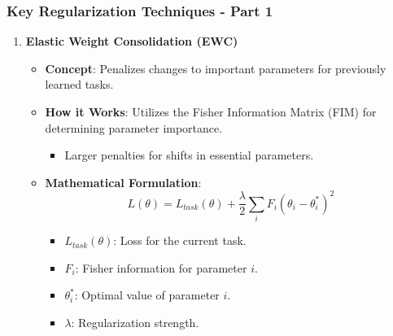 \documentclass[aspectratio=169]{beamer}
\begin{document}
\begin{frame}[fragile]
    \frametitle{Key Regularization Techniques - Part 1}
    \begin{enumerate}
        \item \textbf{Elastic Weight Consolidation (EWC)}
        \begin{itemize}
            \item \textbf{Concept}: Penalizes changes to important parameters for previously learned tasks.
            \item \textbf{How it Works}: Utilizes the Fisher Information Matrix (FIM) for determining parameter importance.
            \begin{itemize}
                \item Larger penalties for shifts in essential parameters.
            \end{itemize}
            \item \textbf{Mathematical Formulation}:
            \begin{equation}
            L(\theta) = L_{task}(\theta) + \frac{\lambda}{2} \sum_{i} F_{i} (\theta_i - \theta^*_i)^2
            \end{equation}
            \begin{itemize}
                \item \( L_{task}(\theta) \): Loss for the current task.
                \item \( F_{i} \): Fisher information for parameter \( i \).
                \item \( \theta^*_i \): Optimal value of parameter \( i \).
                \item \( \lambda \): Regularization strength.
            \end{itemize}
        \end{itemize}
    \end{enumerate}
\end{frame}
\end{document}
